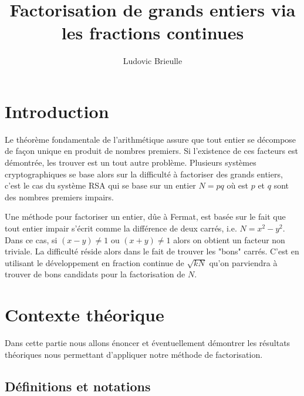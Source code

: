 \documentclass[a4paper]{article} %
\numberwithin{equation}{section}
\begin{document}
\title{Factorisation de grands entiers via les fractions continues}
\author{Ludovic Brieulle}
\newtheorem{thm}{Thèorème}[section]
\newtheorem{lem}[thm]{Lemme}
\newtheorem{cor}{Corollaire}
\newtheorem{prop}[thm]{Proposition}
\theoremstyle{definition}
\newtheorem{defn}[thm]{Définition}
\newtheorem*{ex}{Exemple}
\theoremstyle{remark}
\newtheorem*{rem}{Remarque}
\titlepage
\maketitle
\newpage
\tableofcontents
\newpage
\clearpage
{}
\section*{Introduction}
Le théorème fondamentale de l'arithmétique assure que tout entier se décompose de façon unique en produit de nombres premiers. Si l'existence de ces facteurs est démontrée, les trouver est un tout autre problème. Plusieurs systèmes cryptographiques se base alors sur la difficulté à factoriser des grands entiers, c'est le cas du système RSA qui se base sur un entier $N = pq$ où est $p$ et $q$ sont des nombres premiers impairs.\par
Une méthode pour factoriser un entier, dûe à Fermat, est basée sur le fait que tout entier impair s'écrit comme la différence de deux carrés, i.e. $N = x^2 - y^2$. Dans ce cas, si $(x - y) \neq1$ ou $(x + y) \neq1$ alors on obtient un facteur non triviale. La difficulté réside alors dans le fait de trouver les "bons" carrés. C'est en utilisant le développement en fraction continue de $\sqrt{kN}$  qu'on parviendra à trouver de bons candidats pour la factorisation de $N$.
\newpage
\section{Contexte théorique}
Dans cette partie nous allons énoncer et éventuellement démontrer les résultats théoriques nous permettant d'appliquer notre méthode de factorisation. 
\subsection{Définitions et notations}
\end{document}

